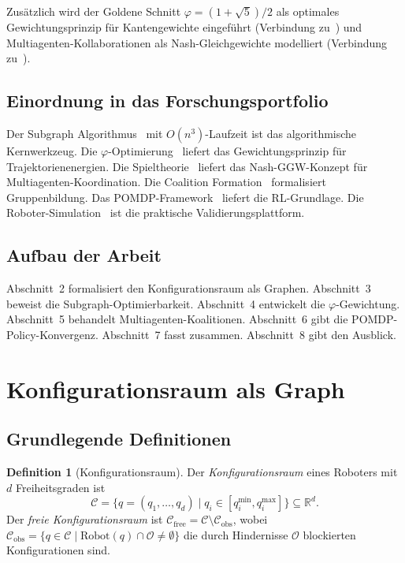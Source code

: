 ﻿\documentclass[a4paper,12pt]{article}
\theoremstyle{definition}
\newtheorem{definition}{Definition}
\newcommand{\Cspace}{\mathcal{C}}
\newcommand{\Cfree}{\mathcal{C}_{\mathrm{free}}}
\newcommand{\Cobs}{\mathcal{C}_{\mathrm{obs}}}
\begin{document}
Zus\"atzlich wird der Goldene Schnitt $\varphi = (1+\sqrt{5})/2$
als optimales Gewichtungsprinzip f\"ur Kantengewichte eingef\"uhrt
(Verbindung zu~\cite{epp2026robophi,epp2026expl})
und Multiagenten-Kollaborationen als Nash-Gleichgewichte modelliert
(Verbindung zu~\cite{epp2026spieltheorie,epp2026ecfta,epp2026hetnet}).

\subsection{Einordnung in das Forschungsportfolio}

Der Subgraph Algorithmus~\cite{epp2026subgraph} mit $O(n^3)$-Laufzeit ist
das algorithmische Kernwerkzeug.
Die $\varphi$-Optimierung~\cite{epp2026robophi,epp2026expl} liefert das
Gewichtungsprinzip f\"ur Trajektorienenergien.
Die Spieltheorie~\cite{epp2026spieltheorie} liefert das Nash-GGW-Konzept
f\"ur Multiagenten-Koordination.
Die Coalition Formation~\cite{epp2026ecfta} formalisiert Gruppenbildung.
Das POMDP-Framework~\cite{epp2026hetnet} liefert die RL-Grundlage.
Die Roboter-Simulation~\cite{epp2026robosim} ist die praktische Validierungsplattform.

\subsection{Aufbau der Arbeit}

Abschnitt~2 formalisiert den Konfigurationsraum als Graphen.
Abschnitt~3 beweist die Subgraph-Optimierbarkeit.
Abschnitt~4 entwickelt die $\varphi$-Gewichtung.
Abschnitt~5 behandelt Multiagenten-Koalitionen.
Abschnitt~6 gibt die POMDP-Policy-Konvergenz.
Abschnitt~7 fasst zusammen. Abschnitt~8 gibt den Ausblick.

\section{Konfigurationsraum als Graph}

\subsection{Grundlegende Definitionen}

\begin{definition}[Konfigurationsraum]
Der \emph{Konfigurationsraum} eines Roboters mit $d$ Freiheitsgraden ist
\[
\Cspace = \{q = (q_1, \ldots, q_d) \mid q_i \in [q_i^{\min}, q_i^{\max}]\}
\subseteq \mathbb{R}^d.
\]
Der \emph{freie Konfigurationsraum} ist
$\Cfree = \Cspace \setminus \Cobs$,
wobei $\Cobs = \{q \in \Cspace \mid \mathrm{Robot}(q) \cap \mathcal{O} \neq \emptyset\}$
die durch Hindernisse $\mathcal{O}$ blockierten Konfigurationen sind.
\end{definition}
\end{document}
